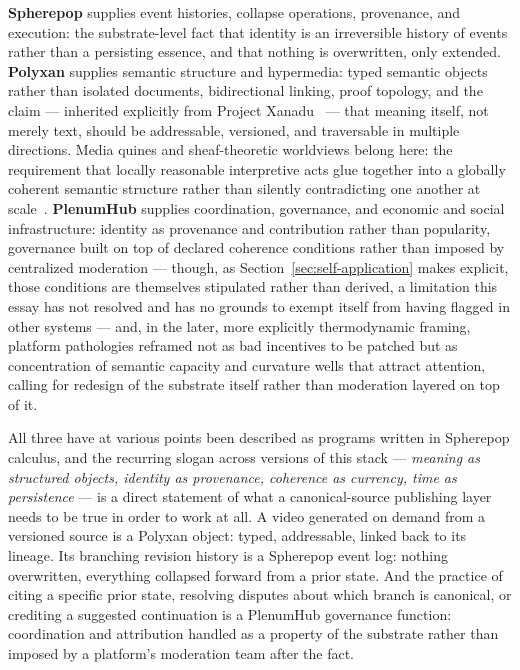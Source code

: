 \documentclass[11pt]{article}
\theoremstyle{definition}
\begin{document}
\textbf{Spherepop} supplies event histories, collapse operations, provenance, and execution: the substrate-level fact that identity is an irreversible history of events rather than a persisting essence, and that nothing is overwritten, only extended. \textbf{Polyxan} supplies semantic structure and hypermedia: typed semantic objects rather than isolated documents, bidirectional linking, proof topology, and the claim --- inherited explicitly from Project Xanadu~\cite{nelson1999} --- that meaning itself, not merely text, should be addressable, versioned, and traversable in multiple directions. Media quines and sheaf-theoretic worldviews belong here: the requirement that locally reasonable interpretive acts glue together into a globally coherent semantic structure rather than silently contradicting one another at scale~\cite{maclane1992}. \textbf{PlenumHub} supplies coordination, governance, and economic and social infrastructure: identity as provenance and contribution rather than popularity, governance built on top of declared coherence conditions rather than imposed by centralized moderation --- though, as Section~\ref{sec:self-application} makes explicit, those conditions are themselves stipulated rather than derived, a limitation this essay has not resolved and has no grounds to exempt itself from having flagged in other systems --- and, in the later, more explicitly thermodynamic framing, platform pathologies reframed not as bad incentives to be patched but as concentration of semantic capacity and curvature wells that attract attention, calling for redesign of the substrate itself rather than moderation layered on top of it.

All three have at various points been described as programs written in Spherepop calculus, and the recurring slogan across versions of this stack --- \emph{meaning as structured objects, identity as provenance, coherence as currency, time as persistence} --- is a direct statement of what a canonical-source publishing layer needs to be true in order to work at all. A video generated on demand from a versioned source is a Polyxan object: typed, addressable, linked back to its lineage. Its branching revision history is a Spherepop event log: nothing overwritten, everything collapsed forward from a prior state. And the practice of citing a specific prior state, resolving disputes about which branch is canonical, or crediting a suggested continuation is a PlenumHub governance function: coordination and attribution handled as a property of the substrate rather than imposed by a platform's moderation team after the fact.
\end{document}

